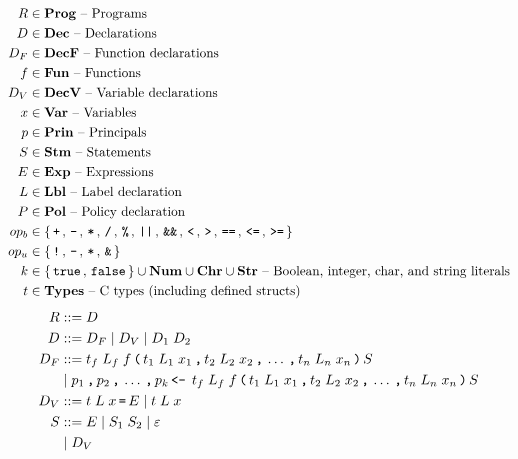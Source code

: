 \begin{table}[p]
  \begin{align*}
    R       & \in \mathbf{Prog} \text{ -- Programs}\\
    D       & \in \mathbf{Dec} \text{ -- Declarations}\\
    D_F     & \in \mathbf{DecF} \text{ -- Function declarations}\\
    f       & \in \mathbf{Fun} \text{ -- Functions}\\
    D_V     & \in \mathbf{DecV} \text{ -- Variable declarations}\\
    x       & \in \mathbf{Var} \text{ -- Variables}\\
    p       & \in \mathbf{Prin} \text{ -- Principals}\\
    S       & \in \mathbf{Stm} \text{ -- Statements}\\
    E       & \in \mathbf{Exp} \text{ -- Expressions}\\
    L       & \in \mathbf{Lbl} \text{ -- Label declaration}\\
    P       & \in \mathbf{Pol} \text{ -- Policy declaration}\\
    op_b    & \in \{ \, \texttt{+} \, ,  \, \texttt{-} \, ,  \, \texttt{*} \, ,  \, \texttt{/} \, ,  \, \texttt{\%} \, ,  \, \texttt{||} \, ,  \, \texttt{\&\&} \, ,  \, \texttt{<} \, ,  \, \texttt{>} \, ,  \, \texttt{==} \, ,  \, \texttt{<=} \, ,  \, \texttt{>=} \, \} \\
    op_u    & \in \{ \, \texttt{!} \, ,  \, \texttt{-} \, , \, \texttt{*} \, , \, \texttt{\&} \, \} \\
    k       & \in \{ \, \texttt{true} \,, \, \texttt{false} \, \} \cup \mathbf{Num} \cup \mathbf{Chr} \cup \mathbf{Str} \text{ -- Boolean, integer, char, and string literals} \\
    t       & \in \mathbf{Types} \text{ -- C types (including defined structs)}
  \end{align*}
  \begin{align*}
    R         & ::= D \\
    D         & ::= D_F \gp D_V \gp D_1 \; D_2 \\
    D_F       & ::= t_f \; L_f \; f \tk ( t_1 \; L_1 \; x_1 \tk , t_2 \; L_2 \; x_2 \tk , \dots \tk , t_n \; L_n \; x_n \tk ) S \\
              & \gp p_1 \tk , p_2 \tk , \dots \tk , p_k \tk{<-} \; t_f \; L_f \; f \tk ( t_1 \; L_1 \; x_1 \tk , t_2 \; L_2 \; x_2 \tk , \dots \tk , t_n \; L_n \; x_n \tk ) S \\
    D_V       & ::= t \; L \; x \tk = E \gp t \; L \; x \\
    S         & ::= E \gp S_1 \; S_2 \gp \varepsilon \\
              & \gp D_V \\

\end{align*}
\end{table}
